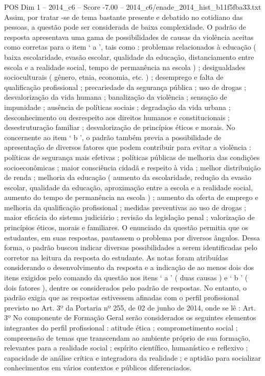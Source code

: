 \begin{textsample}{POS Dim 1 – 2014\_c6 – Score -7.00 – 2014\_c6/enade\_2014\_hist\_b11f5fba33.txt}
Assim, por tratar -se de tema bastante presente e debatido no cotidiano das pessoas, a questão pode ser considerada de baixa complexidade.
O padrão de resposta apresentava uma gama de possibilidades de causas da violência aceitas como corretas para o item ‘ a ’, tais como : problemas relacionados à educação ( baixa escolaridade, evasão escolar, qualidade da educação, distanciamento entre escola e a realidade social, tempo de permanência na escola ) ; desigualdades socioculturais ( gênero, etnia, economia, etc. ) ; desemprego e falta de qualificação profissional ; precariedade da segurança pública ; uso de drogas ; desvalorização da vida humana ; banalização da violência ; sensação de impunidade ; ausência de políticas sociais ; degradação da vida urbana ; desconhecimento ou desrespeito aos direitos humanos e constitucionais ; desestruturação familiar ; desvalorização de princípios éticos e morais.
No concernente ao item ‘ b ’, o padrão também previa a possibilidade de apresentação de diversos fatores que podem contribuir para evitar a violência : políticas de segurança mais efetivas ; políticas públicas de melhoria das condições socioeconômicas ; maior consciência cidadã e respeito à vida ; melhor distribuição de renda ; melhoria da educação ( aumento da escolaridade, redução da evasão escolar, qualidade da educação, aproximação entre a escola e a realidade social, aumento do tempo de permanência na escola ) ; aumento da oferta de emprego e melhoria da qualificação profissional ; medidas preventivas ao uso de drogas ; maior eficácia do sistema judiciário ; revisão da legislação penal ; valorização de princípios éticos, morais e familiares.
O enunciado da questão permitia que os estudantes, em suas respostas, pautassem o problema por diversos ângulos.
Dessa forma, o padrão buscou indicar diversas possibilidades a serem identificadas pelo corretor na leitura da resposta do estudante.
As notas foram atribuídas considerando o desenvolvimento da resposta e a indicação de ao menos dois dos itens exigidos pelo comando da questão nos itens ‘ a ’ ( duas causas ) e ‘ b ’ ( dois fatores ), dentre os considerados pelo padrão de respostas.
No entanto, o padrão exigia que as respostas estivessem afinadas com o perfil profissional previsto no Art. 3º da Portaria nº 255, de 02 de junho de 2014, onde se lê : Art. 3º No componente de Formação Geral serão considerados os seguintes elementos integrantes do perfil profissional : atitude ética ; comprometimento social ; compreensão de temas que transcendam ao ambiente próprio de sua formação, relevantes para a realidade social ; espírito científico, humanístico e reflexivo ; capacidade de análise crítica e integradora da realidade ; e aptidão para socializar conhecimentos em vários contextos e públicos diferenciados.

\end{textsample}
